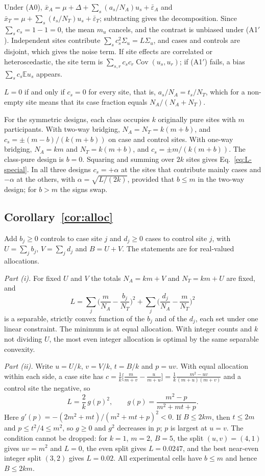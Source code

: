 Under (A0), $\bar x_A=\mu+\Delta+\sum_s(a_s/N_A)u_s+\bar\varepsilon_A$ and $\bar x_T=\mu+\sum_s(t_s/N_T)u_s+\bar\varepsilon_T$; subtracting gives the decomposition. Since $\sum_sc_s=1-1=0$, the mean $m_u$ cancels, and the contrast is unbiased under (A1$'$). Independent sites contribute $\sum_sc_s^2\Sigma_u=L\Sigma_u$, and cases and controls are disjoint, which gives the noise term. If site effects are correlated or heteroscedastic, the site term is $\sum_{s,r}c_sc_r\operatorname{Cov}(u_s,u_r)$; if (A1$'$) fails, a bias $\sum_sc_s\mathbb{E}u_s$ appears.

$L=0$ if and only if $c_s=0$ for every site, that is, $a_s/N_A=t_s/N_T$, which for a non-empty site means that its case fraction equals $N_A/(N_A+N_T)$.

For the symmetric designs, each class occupies $k$ originally pure sites with $m$ participants. With two-way bridging, $N_A=N_T=k(m+b)$, and $c_s=\pm(m-b)/(k(m+b))$ on case and control sites. With one-way bridging, $N_A=km$ and $N_T=k(m+b)$, and $c_s=\pm m/(k(m+b))$. The class-pure design is $b=0$. Squaring and summing over $2k$ sites gives Eq.~\eqref{eq:L-special}. In all three designs $c_s=+\alpha$ at the sites that contribute mainly cases and $-\alpha$ at the others, with $\alpha=\sqrt{L/(2k)}$, provided that $b\le m$ in the two-way design; for $b>m$ the signs swap.

\subsection{Corollary~\ref{cor:alloc}}

Add $b_j\ge0$ controls to case site $j$ and $d_j\ge0$ cases to control site $j$, with $U=\sum_jb_j$, $V=\sum_jd_j$ and $B=U+V$. The statements are for real-valued allocations.

\emph{Part (i).} For fixed $U$ and $V$ the totals $N_A=km+V$ and $N_T=km+U$ are fixed, and
\[
L=\sum_j\Big(\frac m{N_A}-\frac{b_j}{N_T}\Big)^2+\sum_j\Big(\frac{d_j}{N_A}-\frac m{N_T}\Big)^2
\]
is a separable, strictly convex function of the $b_j$ and of the $d_j$, each set under one linear constraint. The minimum is at equal allocation. With integer counts and $k$ not dividing $U$, the most even integer allocation is optimal by the same separable convexity.

\emph{Part (ii).} Write $u=U/k$, $v=V/k$, $t=B/k$ and $p=uv$. With equal allocation within each side, a case site has $c=\frac1k\big[\frac m{m+v}-\frac u{m+u}\big]=\frac1k\frac{m^2-uv}{(m+u)(m+v)}$ and a control site the negative, so
\[
L=\frac2k\,g(p)^2,\qquad g(p)=\frac{m^2-p}{m^2+mt+p}.
\]
Here $g'(p)=-(2m^2+mt)/(m^2+mt+p)^2<0$. If $B\le2km$, then $t\le2m$ and $p\le t^2/4\le m^2$, so $g\ge0$ and $g^2$ decreases in $p$; $p$ is largest at $u=v$. The condition cannot be dropped: for $k=1$, $m=2$, $B=5$, the split $(u,v)=(4,1)$ gives $uv=m^2$ and $L=0$, the even split gives $L=0.0247$, and the best near-even integer split $(3,2)$ gives $L=0.02$. All experimental cells have $b\le m$ and hence $B\le2km$.

